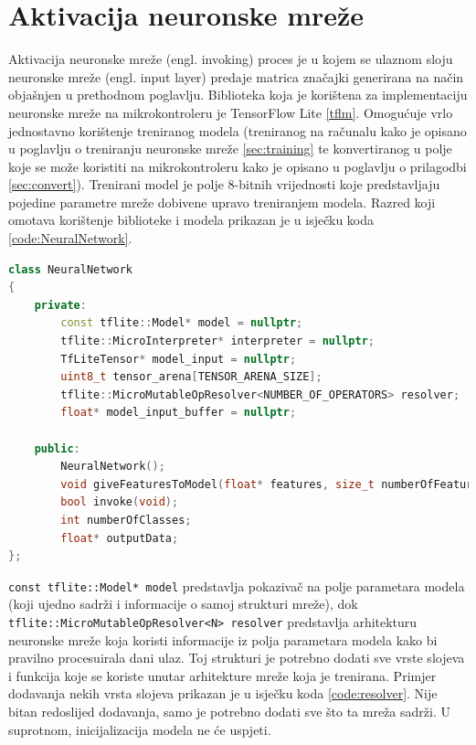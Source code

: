 \section{Aktivacija neuronske mreže}
\label{sec:activation}

Aktivacija neuronske mreže (engl. invoking) proces je u kojem se ulaznom sloju neuronske mreže 
(engl. input layer) predaje matrica značajki generirana na način objašnjen u prethodnom
poglavlju. Biblioteka koja je korištena za implementaciju
neuronske mreže na mikrokontroleru je TensorFlow Lite \ref{tflm}. Omogućuje vrlo jednostavno
korištenje treniranog modela (treniranog na računalu kako je opisano u poglavlju
o treniranju neuronske mreže \ref{sec:training} te konvertiranog
u polje koje se može koristiti na mikrokontroleru kako je opisano u poglavlju
o prilagodbi \ref{sec:convert}). Trenirani model
je polje 8-bitnih vrijednosti koje predstavljaju pojedine parametre mreže dobivene upravo 
treniranjem modela. Razred koji omotava korištenje biblioteke i modela prikazan je 
u isječku koda \ref{code:NeuralNetwork}. 

\begin{lstlisting}[language=C++, caption=Razred neuronske mreže, label=code:NeuralNetwork]
class NeuralNetwork
{
    private:
        const tflite::Model* model = nullptr;
        tflite::MicroInterpreter* interpreter = nullptr;
        TfLiteTensor* model_input = nullptr;
        uint8_t tensor_arena[TENSOR_ARENA_SIZE];
        tflite::MicroMutableOpResolver<NUMBER_OF_OPERATORS> resolver;
        float* model_input_buffer = nullptr;

    public:
        NeuralNetwork();
        void giveFeaturesToModel(float* features, size_t numberOfFeatures);
        bool invoke(void);
        int numberOfClasses;
        float* outputData;  
};   
\end{lstlisting}

\texttt{const tflite::Model* model} predstavlja 
pokazivač na polje parametara modela (koji ujedno sadrži i informacije o samoj strukturi mreže),
dok \texttt{tflite::MicroMutableOpResolver<N> resolver}
predstavlja arhitekturu neuronske mreže koja koristi informacije iz polja parametara
modela kako bi pravilno procesuirala dani ulaz. Toj strukturi je potrebno dodati sve vrste slojeva 
i funkcija koje se koriste unutar arhitekture mreže koja je trenirana. Primjer dodavanja 
nekih vrsta slojeva prikazan je u isječku koda \ref{code:resolver}. Nije bitan redoslijed 
dodavanja, samo je potrebno dodati sve što ta mreža sadrži. U suprotnom, inicijalizacija
modela ne će uspjeti.

